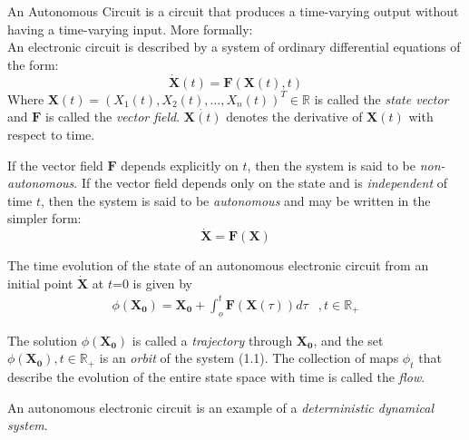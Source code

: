An Autonomous Circuit is a circuit that produces a time-varying output without having a time-varying input\cite{Kennedy95}. More formally:\\

An electronic circuit is described by a system of ordinary differential equations of the form:
\begin{equation*}
\dot{\mathbf{X}}(t)=\mathbf{F}(\mathbf{X}(t),t)
\end{equation*}
Where $\mathbf{X}(t)=(X_1(t),X_2(t),...,X_n(t))^T \in \mathbb{R}$ is called the \emph{state vector} and $\mathbf{F}$ is called the \emph{vector field}. $\dot{\mathbf{X}(t)}$ denotes the derivative of $\mathbf{X}(t)$ with respect to time.

If the vector field $\mathbf{F}$ depends explicitly on $t$, then the system is said to be \emph{non-autonomous}. If the vector field depends only on the state and is \emph{independent} of time $t$, then the system is said to be \emph{autonomous} and may be written in the simpler form:\\
\begin{equation}\dot{\mathbf{X}}=\mathbf{F}(\mathbf{X})\end{equation}


The time evolution of the state of an autonomous electronic circuit from an initial point $\dot{\mathbf{X}}$ at $t$=0 is given by\\

\begin{align*}\phi(\mathbf{X_0})=\mathbf{X_0}+\int_o^t\mathbf{F}(\mathbf{X}(\tau))d\tau &, t \in \mathbb{R}_+\end{align*}

The solution $\phi(\mathbf{X_0})$ is called a \emph{trajectory} through $\mathbf{X_0}$, and the set ${\phi(\mathbf{X_0}),t \in \mathbb{R}_+}$ is an \emph{orbit} of the system (1.1). The collection of maps ${\phi_t}$ that describe the evolution of the entire state space with time is called the \emph{flow}.

An autonomous electronic circuit is an example of a \emph{deterministic dynamical system}.